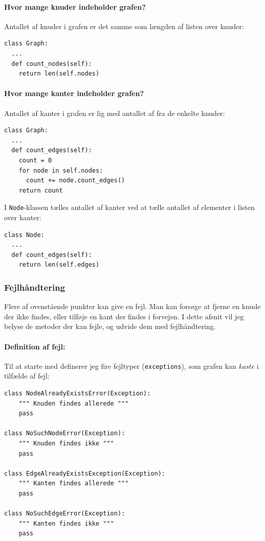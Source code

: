 \documentclass[10pt,a4paper,danish]{article}
\newcommand{\ct}{\texttt}
\begin{document}
\paragraph{Hvor mange knuder indeholder grafen?}
Antallet af knuder i grafen er det samme som længden af listen over
knuder:
{\small
\begin{verbatim}
class Graph:
  ...
  def count_nodes(self):
    return len(self.nodes)
\end{verbatim}}

\paragraph{Hvor mange kanter indeholder grafen?}
Antallet af kanter i grafen er lig med antallet af fra de enkelte
knuder:
{\small
\begin{verbatim}
class Graph:
  ...
  def count_edges(self):
    count = 0
    for node in self.nodes:
      count += node.count_edges()
    return count
\end{verbatim}}

I \ct{Node}-klassen tælles antallet af kanter ved at tælle antallet af
elementer i listen over kanter:
{\small
\begin{verbatim}
class Node:
  ...
  def count_edges(self):
    return len(self.edges)
\end{verbatim}}


\subsubsection{Fejlhåndtering}
Flere af ovenstående punkter kan give en fejl. Man kan forsøge at
fjerne en knude der ikke findes, eller tilføje en kant der findes i
forvejen. I dette afsnit vil jeg belyse de metoder der kan fejle, og
udvide dem med fejlhåndtering.

\paragraph{Definition af fejl:}
Til at starte med definerer jeg fire fejltyper (\ct{exceptions}), som
grafen kan \textit{kaste} i tilfælde af fejl:
{\small
\begin{verbatim}
class NodeAlreadyExistsError(Exception):
    """ Knuden findes allerede """
    pass

class NoSuchNodeError(Exception):
    """ Knuden findes ikke """
    pass

class EdgeAlreadyExistsException(Exception):
    """ Kanten findes allerede """
    pass

class NoSuchEdgeError(Exception):
    """ Kanten findes ikke """
    pass
\end{verbatim}}
\end{document}
